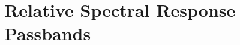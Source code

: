 \documentclass{aastex6}
\begin{document}









\appendix

\section{Relative Spectral Response Passbands}
\end{document}

